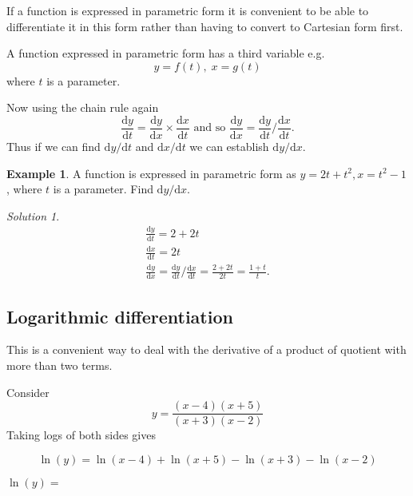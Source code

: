 \documentclass[
  11pt,
  oneside]{book}
\newcommand{\slide}{}
\theoremstyle{definition}
\theoremstyle{definition}
\newtheorem{example}{Example}[chapter]
\theoremstyle{definition}
\theoremstyle{definition}
\theoremstyle{remark}
\newtheorem*{solution}{Solution}
\begin{document}
If a function is expressed in parametric form it is convenient to be able to differentiate it in this form rather than having to convert to Cartesian form first.

A function expressed in parametric form has a third variable e.g.
\[
y = f(t),\; x = g(t)
\]
where \(t\) is a parameter.

Now using the chain rule again
\[
\frac{\mathrm{d} y}{\mathrm{d} t} = \frac{\mathrm{d} y}{\mathrm{d} x}\times\frac{\mathrm{d} x}{\mathrm{d} t}\text{ and so }\frac{\mathrm{d} y}{\mathrm{d} x} = \frac{\mathrm{d} y}{\mathrm{d} t}/\frac{\mathrm{d} x}{\mathrm{d} t}.
\]
Thus if we can find \(\mathrm{d}y/\mathrm{d} t\) and \(\mathrm{d}x/\mathrm{d} t\) we can establish \(\mathrm{d}y/\mathrm{d} x\).

\slide

\begin{example}
A function is expressed in parametric form as \(y = 2t + t^2, x = t^2 - 1\), where \(t\) is a parameter. Find \(\mathrm{d}y/\mathrm{d} x\).
\end{example}

\begin{solution}
\begin{gather*}
\frac{\mathrm{d} y}{\mathrm{d} t} = 2+2t\\
\frac{\mathrm{d} x}{\mathrm{d} t} = 2t\\
\frac{\mathrm{d} y}{\mathrm{d} x} = \frac{\mathrm{d} y}{\mathrm{d} t}/\frac{\mathrm{d} x}{\mathrm{d} t} = \frac{2+2t}{2t} = \frac{1+t}{t}.
\end{gather*}
\end{solution}

\slide

\subsection{Logarithmic differentiation}\label{logarithmic-differentiation}

This is a convenient way to deal with the derivative of a product of quotient with more than two terms.

Consider
\[
y = \frac{(x-4)(x+5)}{(x+3)(x-2)}
\]
Taking logs of both sides gives

\begin{notslides}

\[
\ln(y) = \ln(x-4)+\ln(x+5)-\ln(x+3)-\ln(x-2)
\]

\end{notslides}

\begin{slidesonly}

\(\ln(y) =\)

\end{slidesonly}
\end{document}
